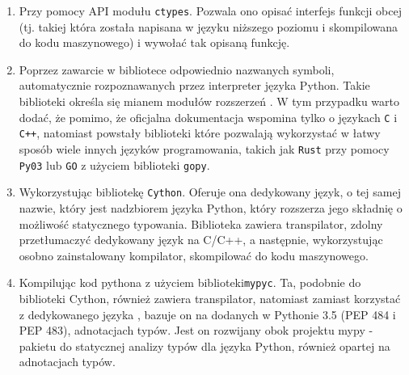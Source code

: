 \documentclass[10pt, a4paper]{article}
\newcommand{\code}[1]{\texttt{#1}}
\begin{document}
\begin{sloppypar}
    \begin{enumerate}
      \item Przy pomocy API modułu \code{ctypes}\cite{Python_ctypes}. Pozwala ono opisać
        interfejs funkcji obcej (tj. takiej która została napisana w języku niższego
        poziomu i skompilowana do kodu maszynowego) i wywołać tak opisaną funkcję.

      \item Poprzez zawarcie w bibliotece odpowiednio nazwanych symboli, automatycznie
        rozpoznawanych przez interpreter języka Python. Takie biblioteki określa się mianem
        modułów rozszerzeń \cite{Extending_Python_With_C_Cpp}. W tym przypadku warto
        dodać, że pomimo, że oficjalna dokumentacja wspomina tylko o językach \code{C} i
        \code{C++}, natomiast powstały biblioteki które pozwalają wykorzystać w łatwy sposób
        wiele innych języków programowania, takich jak \code{Rust} przy pomocy \code{Py03}\cite{PyO3}
        lub \code{GO} z użyciem biblioteki \code{gopy}\cite{gopy}.

      \item Wykorzystując bibliotekę \code{Cython}\cite{Cython_Org}\cite{Cython_The_Best_Of_Both}.
        Oferuje ona dedykowany język, o tej samej nazwie, który jest nadzbiorem języka Python,
        który rozszerza jego składnię o możliwość statycznego typowania. Biblioteka zawiera
        transpilator, zdolny przetłumaczyć dedykowany język na C/C++, a następnie,
        wykorzystując osobno zainstalowany kompilator, skompilować do kodu maszynowego.

      \item Kompilując kod pythona z użyciem biblioteki\code{mypyc}\cite{mypyc}. Ta,
        podobnie do biblioteki Cython, również zawiera transpilator, natomiast zamiast
        korzystać z dedykowanego języka , bazuje on na dodanych w Pythonie 3.5\cite{Python_3_5}
        (PEP 484\cite{PEP_484} i PEP 483\cite{PEP_483}), adnotacjach typów. Jest on rozwijany
        obok projektu mypy - pakietu do statycznej analizy typów dla języka Python,
        również opartej na adnotacjach typów\cite{mypy}.
    \end{enumerate}


\end{sloppypar}
\end{document}
